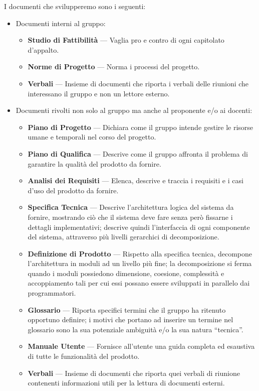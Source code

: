 I documenti che svilupperemo sono i seguenti:
\begin{itemize}
	\item Documenti interni al gruppo:
	\begin{itemize}
		\item \textbf{Studio di Fattibilità} --- Vaglia pro e contro di ogni capitolato d'appalto.
		\item \textbf{Norme di Progetto} --- Norma i processi del progetto.
		\item \textbf{Verbali} --- Insieme di documenti che riporta i verbali delle riunioni che interessano il gruppo e non un lettore esterno.
	\end{itemize}
	\item Documenti rivolti non solo al gruppo ma anche al proponente e/o ai docenti:
	\begin{itemize}
		\item \textbf{Piano di Progetto} --- Dichiara come il gruppo intende gestire le risorse umane e temporali nel corso del progetto.
		\item \textbf{Piano di Qualifica} --- Descrive come il gruppo affronta il problema di garantire la qualità del prodotto da fornire.
		\item \textbf{Analisi dei Requisiti} --- Elenca, descrive e traccia i requisiti e i casi d'uso del prodotto da fornire.
		\item \textbf{Specifica Tecnica} --- Descrive l'architettura logica del sistema da fornire, mostrando ciò che il sistema deve fare senza però fissarne i dettagli implementativi; descrive quindi l'interfaccia di ogni componente del sistema, attraverso più livelli gerarchici di decomposizione.
		\item \textbf{Definizione di Prodotto} --- Rispetto alla specifica tecnica, decompone l'architettura in moduli ad un livello più fine; la decomposizione si ferma quando i moduli possiedono dimensione, coesione, complessità e accoppiamento tali per cui essi possano essere sviluppati in parallelo dai programmatori.
		\item \textbf{Glossario} --- Riporta specifici termini che il gruppo ha ritenuto opportuno definire; i motivi che portano ad inserire un termine nel glossario sono la sua potenziale ambiguità e/o la sua natura “tecnica”.
		\item \textbf{Manuale Utente} --- Fornisce all'utente una guida completa ed esaustiva di tutte le funzionalità del prodotto.
		\item \textbf{Verbali} --- Insieme di documenti che riporta quei verbali di riunione contenenti informazioni utili per la lettura di documenti esterni.
	\end{itemize}
\end{itemize}

